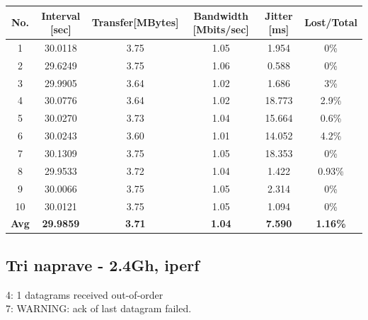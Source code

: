 \documentclass[11pt,a4paper,slovene]{article}
\begin{document}
 \begin{table}[H]
	\begin{adjustwidth}{-3cm}{-3cm}
	\centering
		\begin{tabular}{c|c|c|c|c|c}
		\hline
		\textbf{No.} & \textbf{Interval [sec]} & \textbf{Transfer[MBytes]} & \textbf{Bandwidth [Mbits/sec]} & \textbf{Jitter [ms]} & \textbf{Lost/Total} \\
     		\hline
     		1 & 30.0118 & 3.75 & 1.05 & 1.954 & 0\% \\
  		2 & 29.6249 & 3.75 & 1.06 & 0.588 & 0\% \\
  		3 & 29.9905 & 3.64 & 1.02 & 1.686 & 3\% \\
  		4 & 30.0776 & 3.64 & 1.02 & 18.773 & 2.9\% \\
  		5 & 30.0270 & 3.73 & 1.04 & 15.664 & 0.6\% \\
  		6 & 30.0243 & 3.60 & 1.01 & 14.052 & 4.2\% \\
  		7 & 30.1309 & 3.75 & 1.05 & 18.353 & 0\% \\
  		8 & 29.9533 & 3.72 & 1.04 & 1.422 & 0.93\% \\
  		9 & 30.0066 & 3.75 & 1.05 & 2.314 & 0\% \\
  		10 & 30.0121 & 3.75 & 1.05 & 1.094 & 0\% \\
  		\hline
  		\textbf{Avg} & \textbf{29.9859} & \textbf{3.71} & \textbf{1.04} & \textbf{7.590} & \textbf{1.16\%} \\
  		\hline
    		\end{tabular}
    	\end{adjustwidth}
\end{table}

\subsection{Tri naprave - 2.4Gh, iperf}
4: 1 datagrams received out-of-order\\
7: WARNING: ack of last datagram failed.\\
 
\end{document}
